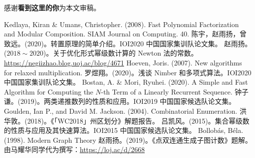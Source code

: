 感谢\textbf{看{\color{red}到这里的你}}为本文审稿。

\begin{thebibliography}{99}
\ifcont
{}
\fi
{} Kedlaya, Kiran \& Umans, Christopher. (2008). Fast Polynomial Factorization and Modular Composition. SIAM Journal on Computing. 40. 
 陈宇，赵雨扬，曾致远。(2020)。转置原理的简单介绍。IOI2020 中国国家集训队论文集。
 赵雨扬。($2018\sim 2020$)。关于优化形式幂级数计算的 Newton 法的常数。\url{https://negiizhao.blog.uoj.ac/blog/4671}
 Hoeven, Joris. (2007). New algorithms for relaxed multiplication.  
 罗煜翔。(2020)。浅谈 Nimber 和多项式算法。IOI2020 中国国家集训队论文集。
 Bostan, A. \& Mori, Ryuhei. (2020). A Simple and Fast Algorithm for Computing the $N$-th Term of a Linearly Recurrent Sequence. 
 钟子谦。(2019)。两类递推数列的性质和应用。IOI2019 中国国家候选队论文集。
 Goulden, Ian P., and David M. Jackson. (2004). Combinatorial Enumeration.
 洪华敦。(2018)。《「WC2018」州区划分》解题报告。
 吕凯风。(2015)。集合幂级数的性质与应用及其快速算法。IOI2015 中国国家候选队论文集。
 Bollobás, Béla. (1998). Modern Graph Theory
 赵雨扬。(2019)。《点双连通生成子图计数》题解。由马耀华同学代为撰写：\url{https://loj.ac/d/2668}
\end{thebibliography}
